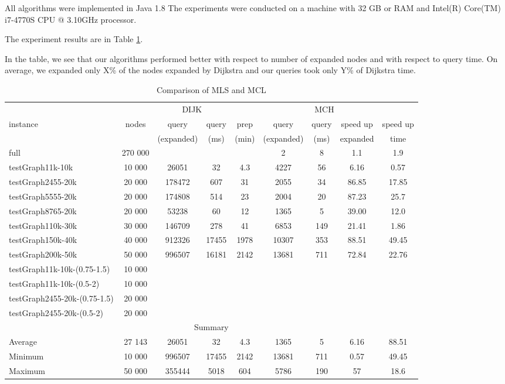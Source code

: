 All algorithms were implemented in Java 1.8 
The experiments were conducted on a machine with 
32 GB or RAM and  Intel(R) Core(TM) i7-4770S CPU @ 3.10GHz processor.

The experiment results are in Table \ref{result}. 

In the table, we see that our algorithms performed better with respect to 
number of expanded nodes and with respect to query time.
On average, we expanded only X\% of the nodes expanded by Dijkstra and our queries 
 took only Y\% of Dijkstra time.


\begin{table}
\caption{Comparison of MLS and MCL}
\label{result}
\begin{tabular}{l|c|cc|ccccc}
 & & \multicolumn{2}{c}{DIJK} & \multicolumn{5}{c}{MCH} \\ \cline{3-6}
instance & nodes & query & query & prep & query & query & speed up & speed up \\ \hline
& & (expanded) & (ms) & (min) & (expanded) & (ms) & expanded & time \\ \hline
full & 270 000 & & & &  2 & 8 & 1.1 & 1.9 \\ \hline
testGraph11k-10k & 10 000 & 26051 & 32 & 4.3 & 4227 & 56 & 6.16 & 0.57 \\ \hline
testGraph2455-20k & 20 000 & 178472 & 607 & 31 & 2055 & 34 & 86.85 & 17.85 \\ \hline
testGraph5555-20k & 20 000 & 174808 & 514 & 23 & 2004 & 20 & 87.23 & 25.7 \\ \hline
testGraph8765-20k & 20 000 & 53238 & 60 & 12 & 1365 & 5 & 39.00 & 12.0 \\ \hline
testGraph110k-30k & 30 000 & 146709 & 278 & 41 & 6853 & 149 & 21.41 & 1.86 \\ \hline
testGraph150k-40k & 40 000 & 912326 & 17455 & 1978 & 10307 & 353 & 88.51& 49.45 \\ \hline
testGraph200k-50k & 50 000 & 996507 & 16181 & 2142 & 13681 & 711 & 72.84& 22.76 \\ \hline
    testGraph11k-10k-(0.75-1.5) & 10 000 & & & & & & & \\ \hline
    testGraph11k-10k-(0.5-2) & 10 000 & & & & & & & \\ \hline
    testGraph2455-20k-(0.75-1.5) & 20 000 & & & & & & & \\ \hline
    testGraph2455-20k-(0.5-2) & 20 000 & & & & & & & \\ \hline

\multicolumn{9}{c}{Summary} \\ \hline
Average & 27 143 & 26051 & 32 & 4.3 & 1365 & 5 & 6.16 & 88.51 \\ \hline
Minimum & 10 000 & 996507 & 17455 & 2142 & 13681 & 711 & 0.57 & 49.45\\ \hline
Maximum & 50 000 & 355444 & 5018 & 604 & 5786 & 190 & 57 & 18.6 \\ \hline
\end{tabular}
\end{table}

